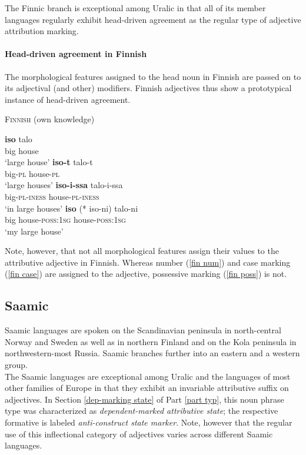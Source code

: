 \noindent The Finnic branch is exceptional among Uralic in that all of its member languages regularly exhibit head-driven agreement as the regular type of adjective attribution marking.

\paragraph{Head-driven agreement in Finnish} \label{finnish synchr}
The morphological features assigned to the head noun in Finnish are passed on to its adjectival (and other) modifiers. Finnish adjectives thus show a prototypical instance of head-driven agreement. 
\begin{exe}
\ex \textsc{Finnish} (own knowledge)
\begin{xlist}
\ex
\gll	\textbf{iso} talo\\
	big house\\
\glt	‘large house’
\ex	\label{fin num}
\gll	\textbf{iso-t} talo-t\\
	big-\textsc{pl} house-\textsc{pl}\\
\glt	‘large houses’
\ex	\label{fin case}
\gll	\textbf{iso-i-ssa}	talo-i-ssa\\
	big-\textsc{pl}-\textsc{iness} house-\textsc{pl}-\textsc{iness}\\
\glt	‘in large houses’
\ex 	\label{fin poss}
\gll	\textbf{iso} (* iso-ni) talo-ni\\
	big {} house-\textsc{poss:1sg} house-\textsc{poss:1sg}\\
\glt	‘my large house’
\end{xlist}
\end{exe}
Note, however, that not all morphological features assign their values to the attributive adjective in Finnish. Whereas number (\ref{fin num}) and case marking (\ref{fin case}) are assigned to the adjective, possessive marking (\ref{fin poss}) is not.

\subsection{Saamic}\label{saami synchr}
Saamic languages are spoken on the Scandinavian peninsula in north-central Norway and Sweden as well as in northern Finland and on the Kola peninsula in northwestern-most Russia. Saamic branches further into an eastern and a western group.\\

\noindent The Saamic languages are exceptional among Uralic and the languages of most other families of Europe in that they exhibit an invariable attributive suffix on adjectives. In Section \ref{dep-marking state} of Part \ref{part typ}, this noun phrase type was characterized as \textit{dependent-marked attributive state}; the respective formative is labeled \textit{anti-construct state marker}. Note, however that the regular use of this inflectional category of adjectives varies across different Saamic languages.

